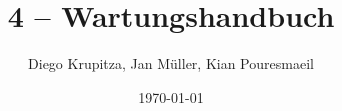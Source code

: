 \usepackage[utf8]{inputenc}
\usepackage[T1]{fontenc}

\usepackage[ngerman]{isodate, babel}
\usepackage[german=quotes]{csquotes}

\usepackage[hyphens]{url}
\usepackage[]{hyperref}
\hypersetup{colorlinks, citecolor=black, linkcolor=black, urlcolor=black}

\usepackage{titling}
\title{4 – Wartungshandbuch}
\author{Diego Krupitza, Jan Müller, Kian Pouresmaeil}
\date{\today}

\usepackage{fancyhdr}
\pagestyle{fancy}
\fancyhead{} %
\renewcommand{\headrulewidth}{0pt} %
\fancyfoot{} %
\fancyfoot[LE,RO]{\thepage} %
\fancyfoot[RE,LO]{\thetitle}
